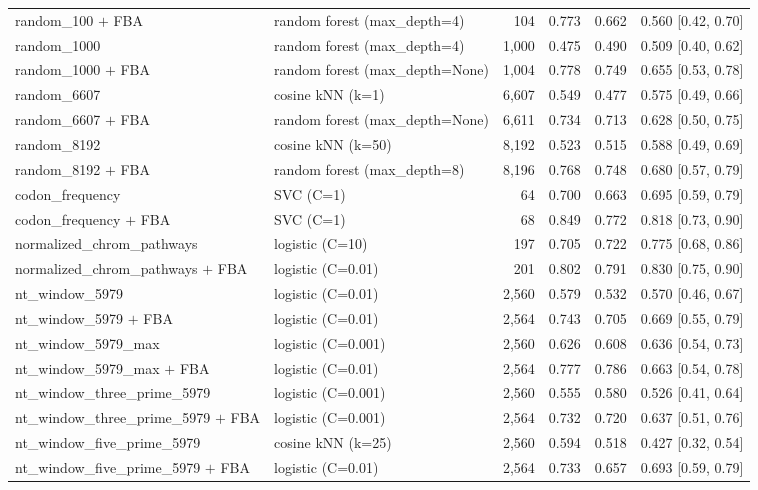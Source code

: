 \begin{longtable}{@{}llrrrl@{}}
    random\_100 $+$ FBA & random forest (max\_depth=4) & 104 & 0.773 & 0.662 & 0.560 [0.42, 0.70] \\
    random\_1000 & random forest (max\_depth=4) & 1,000 & 0.475 & 0.490 & 0.509 [0.40, 0.62] \\
    random\_1000 $+$ FBA & random forest (max\_depth=None) & 1,004 & 0.778 & 0.749 & 0.655 [0.53, 0.78] \\
    random\_6607 & cosine kNN (k=1) & 6,607 & 0.549 & 0.477 & 0.575 [0.49, 0.66] \\
    random\_6607 $+$ FBA & random forest (max\_depth=None) & 6,611 & 0.734 & 0.713 & 0.628 [0.50, 0.75] \\
    random\_8192 & cosine kNN (k=50) & 8,192 & 0.523 & 0.515 & 0.588 [0.49, 0.69] \\
    random\_8192 $+$ FBA & random forest (max\_depth=8) & 8,196 & 0.768 & 0.748 & 0.680 [0.57, 0.79] \\
    codon\_frequency & SVC (C=1) & 64 & 0.700 & 0.663 & 0.695 [0.59, 0.79] \\
    codon\_frequency $+$ FBA & SVC (C=1) & 68 & 0.849 & 0.772 & 0.818 [0.73, 0.90] \\
    normalized\_chrom\_pathways & logistic (C=10) & 197 & 0.705 & 0.722 & 0.775 [0.68, 0.86] \\
    normalized\_chrom\_pathways $+$ FBA & logistic (C=0.01) & 201 & 0.802 & 0.791 & 0.830 [0.75, 0.90] \\
    nt\_window\_5979 & logistic (C=0.01) & 2,560 & 0.579 & 0.532 & 0.570 [0.46, 0.67] \\
    nt\_window\_5979 $+$ FBA & logistic (C=0.01) & 2,564 & 0.743 & 0.705 & 0.669 [0.55, 0.79] \\
    nt\_window\_5979\_max & logistic (C=0.001) & 2,560 & 0.626 & 0.608 & 0.636 [0.54, 0.73] \\
    nt\_window\_5979\_max $+$ FBA & logistic (C=0.01) & 2,564 & 0.777 & 0.786 & 0.663 [0.54, 0.78] \\
    nt\_window\_three\_prime\_5979 & logistic (C=0.001) & 2,560 & 0.555 & 0.580 & 0.526 [0.41, 0.64] \\
    nt\_window\_three\_prime\_5979 $+$ FBA & logistic (C=0.001) & 2,564 & 0.732 & 0.720 & 0.637 [0.51, 0.76] \\
    nt\_window\_five\_prime\_5979 & cosine kNN (k=25) & 2,560 & 0.594 & 0.518 & 0.427 [0.32, 0.54] \\
    nt\_window\_five\_prime\_5979 $+$ FBA & logistic (C=0.01) & 2,564 & 0.733 & 0.657 & 0.693 [0.59, 0.79] \\

\end{longtable}
